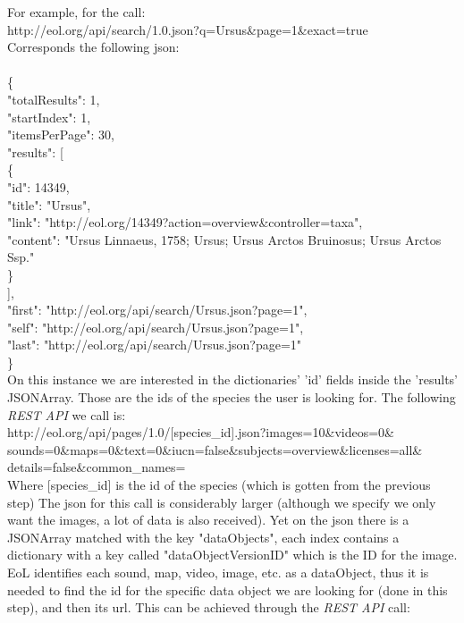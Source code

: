 \documentclass[10pt]{article}
\begin{document}
For example, for the call:\\

http://eol.org/api/search/1.0.json?q=Ursus\&page=1\&exact=true\\

Corresponds the following json:\\\\
\{\\
  "totalResults": 1,\\
  "startIndex": 1,\\
  "itemsPerPage": 30,\\
  "results": [\\
    \{\\
      "id": 14349,\\
      "title": "Ursus",\\
      "link": "http://eol.org/14349?action=overview\&controller=taxa",\\
      "content": "Ursus Linnaeus, 1758; Ursus; Ursus Arctos Bruinosus; Ursus Arctos Ssp."\\
    \}\\
  ],\\
  "first": "http://eol.org/api/search/Ursus.json?page=1",\\
  "self": "http://eol.org/api/search/Ursus.json?page=1",\\
  "last": "http://eol.org/api/search/Ursus.json?page=1"\\
\}\\
 
 On this instance we are interested in the dictionaries' 'id' fields inside the 'results' JSONArray. Those are the ids of the species the user is looking for. The following \textit{REST API} we call is:\\
 
http://eol.org/api/pages/1.0/[species\_id].json?images=10\&videos=0\&\\
sounds=0\&maps=0\&text=0\&iucn=false\&subjects=overview\&licenses=all\&\\
details=false\&common\_names= \\
 
Where [species\_id] is the id of the species (which is gotten from the previous step) The json for this call is considerably larger (although we specify we only want the images, a lot of data is also received). Yet on the json there is a JSONArray matched with the key "dataObjects", each index contains a dictionary with a key called "dataObjectVersionID" which is the ID for the image. EoL identifies each sound, map, video, image, etc. as a dataObject, thus it is needed to find the id for the specific data object we are looking for (done in this step), and then its url. This can be achieved through the \textit{REST API} call:\\
\end{document}
